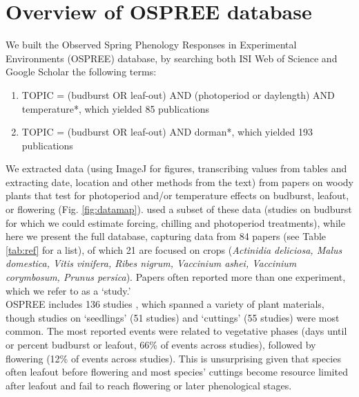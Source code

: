 \documentclass[11pt]{article}
\begin{document}
\section{Overview of OSPREE database}
We built the Observed Spring Phenology Responses in Experimental Environments (OSPREE) database, by searching both ISI Web of Science and Google Scholar  the following terms: 
\begin{enumerate}
\item TOPIC = (budburst OR leaf-out) AND (photoperiod or daylength) AND temperature*, which yielded 85 publications
\item TOPIC = (budburst OR leaf-out) AND dorman*, which yielded 193 publications
\end{enumerate}
We extracted data (using ImageJ for figures, transcribing values from tables and extracting date, location and other methods from the text) from papers on woody plants that test for photoperiod and/or temperature effects on budburst, leafout, or flowering  (Fig. \ref{fig:datamap}). \citet{ettinger2020} used a subset of these data (studies on budburst for which we could estimate forcing, chilling and photoperiod treatments), while here we present the full database, capturing data from 84 papers (see Table \ref{tab:ref} for a list), of which 21 are focused on crops (\emph{Actinidia deliciosa, Malus domestica, Vitis vinifera, Ribes nigrum, Vaccinium ashei, Vaccinium corymbosum, Prunus persica}). Papers often reported more than one experiment, which we refer to as a `study.' \\

OSPREE includes 136 studies \citep[with the earliest study was conducted in 1947,see][]{Lamb:1948aa}, which spanned a variety of plant materials, though studies on `seedlings' (51 studies) and `cuttings' (55 studies) were most common. The most reported events were related to vegetative phases (days until or percent budburst or leafout, 66\% of events across studies), followed by flowering (12\% of events across studies). This is unsurprising given that species often leafout before flowering and most species' cuttings become resource limited after leafout and fail to reach flowering or later phenological stages.\\
\end{document}

